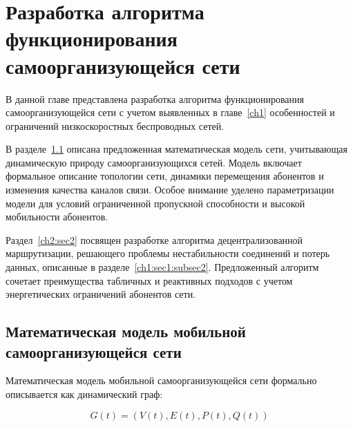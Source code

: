\chapter{Разработка алгоритма функционирования самоорганизующейся сети} \label{ch2}
	

В данной главе представлена разработка алгоритма функционирования самоорганизующейся сети с учетом выявленных в главе~\ref{ch1} особенностей и ограничений низкоскоростных беспроводных сетей. 

В разделе~\ref{ch2:sec1} описана предложенная математическая модель сети, учитывающая динамическую природу самоорганизующихся сетей. Модель включает формальное описание топологии сети, динамики перемещения абонентов и изменения качества каналов связи. Особое внимание уделено параметризации модели для условий ограниченной пропускной способности и высокой мобильности абонентов.

Раздел~\ref{ch2:sec2} посвящен разработке алгоритма децентрализованной маршрутизации, решающего проблемы нестабильности соединений и потерь данных, описанные в разделе~\ref{ch1:sec1:subsec2}. Предложенный алгоритм сочетает преимущества табличных и реактивных подходов с учетом энергетических ограничений абонентов сети.

\section{Математическая модель мобильной самоорганизующейся сети} \label{ch2:sec1}

Математическая модель мобильной самоорганизующейся сети формально описывается как динамический граф:

\begin{equation}
\label{eq:network_model}
G(t) = (V(t), E(t), P(t), Q(t))
\end{equation}

